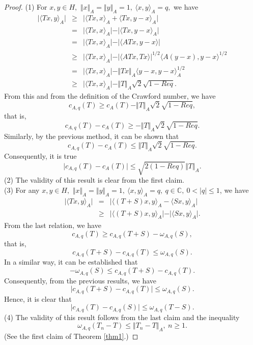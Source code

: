 \documentclass[preprint,12pt,3p]{elsarticle}
\begin{document}
\begin{proof}
 (1) For $ x, y \in H, $ $ \Vert x \Vert_{A}=\Vert y \Vert_{A}=1, \ \langle x,y \rangle_{A}=q, $ we have 
\begin{eqnarray}
\vert \langle Tx,y \rangle_{A}\vert & \geq & \vert \langle Tx,x \rangle_{A}+\langle Tx,y-x \rangle_{A}\vert  \nonumber \\
& = & \vert \langle Tx,x \rangle_{A} \vert - \vert \langle Tx,y-x \rangle_{A}\vert \nonumber \\
& = & \vert \langle Tx,x \rangle_{A} \vert - \vert \langle ATx,y-x \rangle\vert \nonumber \\
& \geq & \vert \langle Tx,x \rangle_{A} \vert - \vert \langle ATx,Tx \rangle\vert^{1/2}\langle A(y-x),y-x\rangle^{1/2} \nonumber \\
& = & \vert \langle Tx,x \rangle_{A} \vert - \Vert Tx \Vert_{A}\langle y-x,y-x\rangle^{1/2}_{A} \nonumber \\
& \geq & \vert \langle Tx,x \rangle_{A} \vert - \Vert T \Vert_{A} \sqrt{2}\sqrt{1-Req}. \nonumber
\end{eqnarray}
From this and from the definition of the Crawford number, we have
$$
c_{A,q}(T)\geq c_{A}(T)-\Vert T \Vert_{A} \sqrt{2}\sqrt{1-Req},
$$
that is,
$$
c_{A,q}(T)-c_{A}(T)\geq - \Vert T \Vert_{A} \sqrt{2}\sqrt{1-Req}.
$$
Similarly, by the previous method, it can be shown that 
$$
c_{A,q}(T)-c_{A}(T)\leq\Vert T \Vert_{A} \sqrt{2}\sqrt{1-Req}.
$$
Consequently, it is true
$$ 
\vert c_{A,q}(T)-c_{A}(T)\vert\leq \sqrt{2(1-Req)}\Vert T \Vert_{A}.
$$
(2) The validity of this result is clear from the first claim. \\
(3) For any $ x, y \in H, $ $ \Vert x \Vert_{A}=\Vert y \Vert_{A}=1, \ \langle x,y \rangle_{A}=q, \ q\in \mathbb{C}, \ 0<\vert q \vert\leq 1 $, we have
\begin{eqnarray}
\vert \langle Tx,y \rangle_{A} \vert & = & \vert \langle (T+S)x,y \rangle_{A} - \langle Sx,y \rangle_{A}  \vert \nonumber \\
& \geq & \vert \langle (T+S)x,y \rangle_{A}\vert - \vert\langle Sx,y \rangle_{A}  \vert . \nonumber
\end{eqnarray}
From the last relation, we have
$$
c_{A,q}(T)\geq c_{A,q}(T+S)-\omega_{A,q}(S),
$$
that is,
$$
c_{A,q}(T+S)-c_{A,q}(T)\leq\omega_{A,q}(S).
$$
In a similar way, it can be established that 
$$
-\omega_{A,q}(S)\leq c_{A,q}(T+S)-c_{A,q}(T).
$$
Consequently, from the previous results, we have
$$
\vert c_{A,q}(T+S)-c_{A,q}(T) \vert \leq \omega_{A,q}(S).
$$
Hence, it is clear that 
$$ 
\vert c_{A,q}(T)-c_{A,q}(S)\vert\leq \omega_{A,q}(T-S).
$$
(4) The validity of this result follows from the last claim and the inequality
$$
\omega_{A,q}(T_{n}-T)\leq \Vert T_{n}-T \Vert_{A}, \ n\geq 1.
$$
(See the first claim of Theorem \ref{thm1}.) 
\end{proof}
\end{document}
